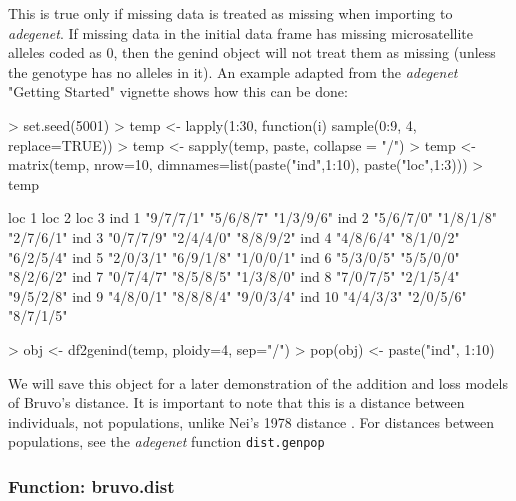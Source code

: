 \documentclass[letterpaper]{article}
\begin{document}
This is true only if missing data is treated as missing when importing to \textit{adegenet}. If missing data in the initial data frame has missing microsatellite alleles coded as 0, then the genind object will not treat them as missing (unless the genotype has no alleles in it). An example adapted from the \textit{adegenet} "Getting Started" vignette shows how this can be done:

\begin{Schunk}
\begin{Sinput}
> set.seed(5001)
> temp <- lapply(1:30, function(i) sample(0:9, 4, replace=TRUE))
> temp <- sapply(temp, paste, collapse = "/")
> temp <- matrix(temp, nrow=10, dimnames=list(paste("ind",1:10), paste("loc",1:3)))
> temp 
\end{Sinput}
\begin{Soutput}
       loc 1     loc 2     loc 3    
ind 1  "9/7/7/1" "5/6/8/7" "1/3/9/6"
ind 2  "5/6/7/0" "1/8/1/8" "2/7/6/1"
ind 3  "0/7/7/9" "2/4/4/0" "8/8/9/2"
ind 4  "4/8/6/4" "8/1/0/2" "6/2/5/4"
ind 5  "2/0/3/1" "6/9/1/8" "1/0/0/1"
ind 6  "5/3/0/5" "5/5/0/0" "8/2/6/2"
ind 7  "0/7/4/7" "8/5/8/5" "1/3/8/0"
ind 8  "7/0/7/5" "2/1/5/4" "9/5/2/8"
ind 9  "4/8/0/1" "8/8/8/4" "9/0/3/4"
ind 10 "4/4/3/3" "2/0/5/6" "8/7/1/5"
\end{Soutput}
\begin{Sinput}
> obj <- df2genind(temp, ploidy=4, sep="/")
> pop(obj) <- paste("ind", 1:10)
\end{Sinput}
\end{Schunk}

We will save this object for a later demonstration of the addition and loss models of Bruvo's distance. It is important to note that this is a distance between individuals, not populations, unlike Nei's 1978 distance \cite{Nei:1978}. For distances between populations, see the \textit{adegenet} function \texttt{dist.genpop}

\subsubsection{Function: bruvo.dist}\label{index:bruvo:bruvo.dist}
\end{document}
